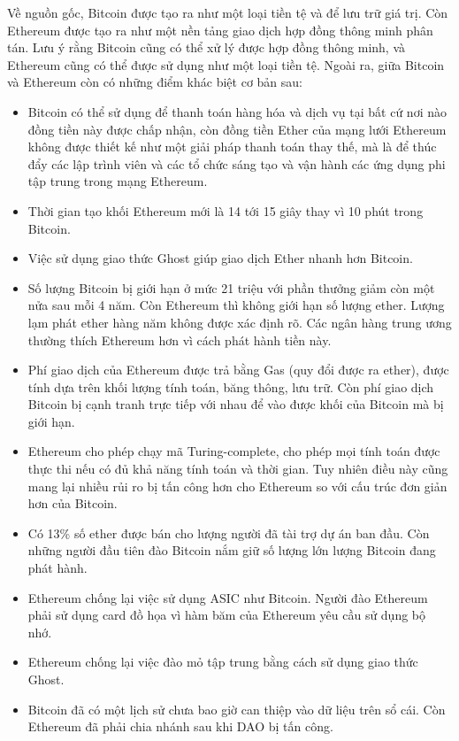 Về nguồn gốc, Bitcoin được tạo ra như một loại tiền tệ và để lưu trữ giá trị. Còn Ethereum được tạo ra như một nền tảng giao dịch hợp đồng thông minh phân tán. Lưu ý rằng Bitcoin cũng có thể xử lý được hợp đồng thông minh, và Ethereum cũng có thể được sử dụng như một loại tiền tệ. Ngoài ra, giữa Bitcoin và Ethereum còn có những điểm khác biệt cơ bản sau:
\begin{itemize}
    \item Bitcoin có thể sử dụng để thanh toán hàng hóa và dịch vụ tại bất cứ nơi nào đồng tiền này được chấp nhận, còn đồng tiền Ether của mạng lưới Ethereum không được thiết kế như một giải pháp thanh toán thay thế, mà là để thúc đẩy các lập trình viên và các tổ chức sáng tạo và vận hành các ứng dụng phi tập trung trong mạng Ethereum.
    \item Thời gian tạo khối Ethereum mới là 14 tới 15 giây thay vì 10 phút trong Bitcoin.
    \item Việc sử dụng giao thức Ghost giúp giao dịch Ether nhanh hơn Bitcoin.
    \item Số lượng Bitcoin bị giới hạn ở mức 21 triệu với phần thưởng giảm còn một nửa sau mỗi 4 năm. Còn Ethereum thì không giới hạn số lượng ether. Lượng lạm phát ether hàng năm không được xác định rõ. Các ngân hàng trung ương thường thích Ethereum hơn vì cách phát hành tiền này.
    \item Phí giao dịch của Ethereum được trả bằng Gas (quy đổi được ra ether), được tính dựa trên khối lượng tính toán, băng thông, lưu trữ. Còn phí giao dịch Bitcoin bị cạnh tranh trực tiếp với nhau để vào được khối của Bitcoin mà bị giới hạn.
    \item Ethereum cho phép chạy mã Turing-complete, cho phép mọi tính toán được thực thi nếu có đủ khả năng tính toán và thời gian. Tuy nhiên điều này cũng mang lại nhiều rủi ro bị tấn công hơn cho Ethereum so với cấu trúc đơn giản hơn của Bitcoin.
    \item Có 13\% số ether được bán cho lượng người đã tài trợ dự án ban đầu. Còn những người đầu tiên đào Bitcoin nắm giữ số lượng lớn lượng Bitcoin đang phát hành.
    \item Ethereum chống lại việc sử dụng ASIC như Bitcoin. Người đào Ethereum phải sử dụng card đồ họa vì hàm băm của Ethereum yêu cầu sử dụng bộ nhớ.
    \item Ethereum chống lại việc đào mỏ tập trung bằng cách sử dụng giao thức Ghost.
    \item Bitcoin đã có một lịch sử chưa bao giờ can thiệp vào dữ liệu trên sổ cái. Còn Ethereum đã phải chia nhánh sau khi DAO bị tấn công.
\end{itemize}


